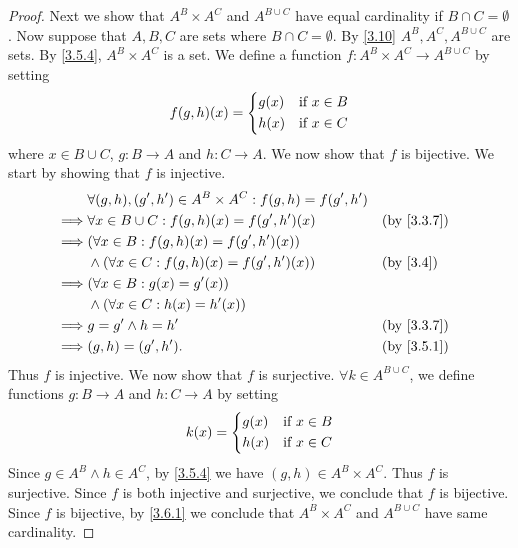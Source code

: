 \begin{proof}
  Next we show that \(A^B \times A^C\) and \(A^{B \cup C}\) have equal cardinality if \(B \cap C = \emptyset\).
  Now suppose that \(A, B, C\) are sets where \(B \cap C = \emptyset\).
  By \cref{3.10} \(A^B, A^C, A^{B \cup C}\) are sets.
  By \cref{3.5.4}, \(A^B \times A^C\) is a set.
  We define a function \(f : A^B \times A^C \to A^{B \cup C}\) by setting
  \[
    f(g, h)(x) = \begin{dcases}
      g(x) & \text{if } x \in B \\
      h(x) & \text{if } x \in C
    \end{dcases}
  \]
  where \(x \in B \cup C\), \(g : B \to A\) and \(h : C \to A\).
  We now show that \(f\) is bijective.
  We start by showing that \(f\) is injective.
  \begin{align*}
             & \forall (g, h), (g', h') \in A^B \times A^C : f(g, h) = f(g', h')                               \\
    \implies & \forall x \in B \cup C : f(g, h)(x) = f(g', h')(x)                &  & \text{(by \cref{3.3.7})} \\
    \implies & (\forall x \in B : f(g, h)(x) = f(g', h')(x))                                                   \\
             & \land (\forall x \in C : f(g, h)(x) = f(g', h')(x))               &  & \text{(by \cref{3.4})}   \\
    \implies & (\forall x \in B : g(x) = g'(x))                                                                \\
             & \land (\forall x \in C : h(x) = h'(x))                                                          \\
    \implies & g = g' \land h = h'                                               &  & \text{(by \cref{3.3.7})} \\
    \implies & (g, h) = (g', h').                                                &  & \text{(by \cref{3.5.1})}
  \end{align*}
  Thus \(f\) is injective.
  We now show that \(f\) is surjective.
  \(\forall k \in A^{B \cup C}\), we define functions \(g : B \to A\) and \(h : C \to A\) by setting
  \[
    k(x) = \begin{dcases}
      g(x) & \text{if } x \in B \\
      h(x) & \text{if } x \in C
    \end{dcases}
  \]
  Since \(g \in A^B \land h \in A^C\), by \cref{3.5.4} we have \((g, h) \in A^B \times A^C\).
  Thus \(f\) is surjective.
  Since \(f\) is both injective and surjective, we conclude that \(f\) is bijective.
  Since \(f\) is bijective, by \cref{3.6.1} we conclude that \(A^B \times A^C\) and \(A^{B \cup C}\) have same cardinality.


\end{proof}
